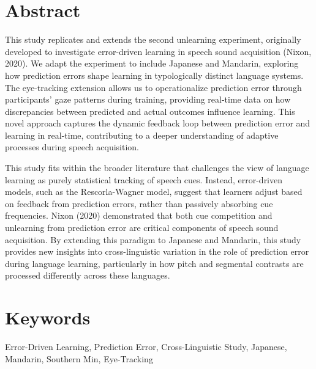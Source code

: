 \section{Abstract}

This study replicates and extends the second unlearning experiment, originally developed to investigate error-driven learning in speech sound acquisition (Nixon, 2020). We adapt the experiment to include Japanese and Mandarin, exploring how prediction errors shape learning in typologically distinct language systems. The eye-tracking extension allows us to operationalize prediction error through participants’ gaze patterns during training, providing real-time data on how discrepancies between predicted and actual outcomes influence learning. This novel approach captures the dynamic feedback loop between prediction error and learning in real-time, contributing to a deeper understanding of adaptive processes during speech acquisition.

This study fits within the broader literature that challenges the view of language learning as purely statistical tracking of speech cues. Instead, error-driven models, such as the Rescorla-Wagner model, suggest that learners adjust based on feedback from prediction errors, rather than passively absorbing cue frequencies. Nixon (2020) demonstrated that both cue competition and unlearning from prediction error are critical components of speech sound acquisition. By extending this paradigm to Japanese and Mandarin, this study provides new insights into cross-linguistic variation in the role of prediction error during language learning, particularly in how pitch and segmental contrasts are processed differently across these languages.


\section{Keywords}
Error-Driven Learning, Prediction Error, Cross-Linguistic Study, Japanese, Mandarin, Southern Min, Eye-Tracking
\newpage


